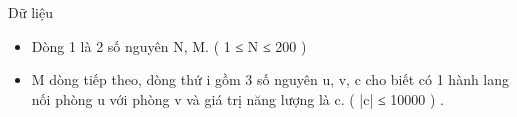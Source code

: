Dữ liệu
\begin{itemize}
	\item Dòng 1 là 2 số nguyên N, M. ( 1 ≤ N ≤ 200 )
	\item M dòng tiếp theo, dòng thứ i gồm 3 số nguyên u, v, c cho biết có 1 hành lang nối phòng u với phòng v và giá trị năng lượng là c. ( |c| ≤ 10000 ) .
\end{itemize}